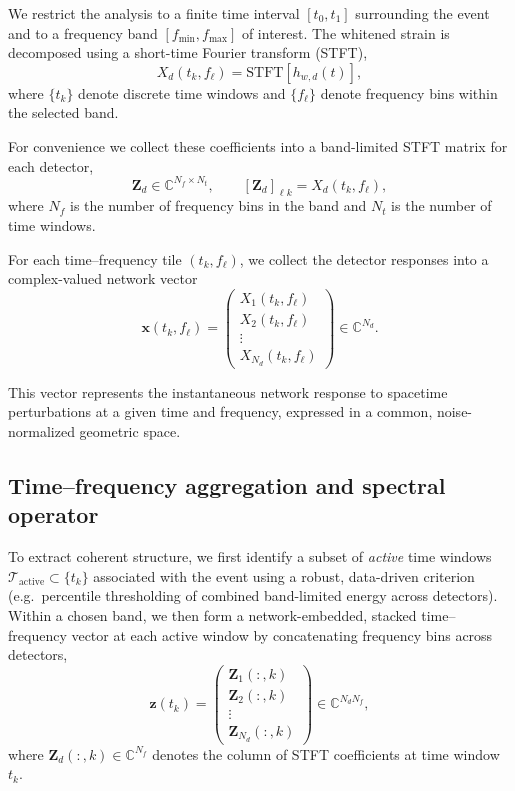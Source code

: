 \documentclass[11pt,a4paper]{article}
\begin{document}
We restrict the analysis to a finite time interval $[t_0, t_1]$ surrounding the event and to a frequency band $[f_{\min}, f_{\max}]$ of interest.
The whitened strain is decomposed using a short-time Fourier transform (STFT),
\begin{equation}
X_d(t_k, f_\ell) = \mathrm{STFT}\!\left[h_{w,d}(t)\right],
\end{equation}
where $\{t_k\}$ denote discrete time windows and $\{f_\ell\}$ denote frequency bins within the selected band.

For convenience we collect these coefficients into a band-limited STFT matrix for each detector,
\begin{equation}
\mathbf{Z}_d \in \mathbb{C}^{N_f \times N_t},
\qquad
[\mathbf{Z}_d]_{\ell k} = X_d(t_k,f_\ell),
\end{equation}
where $N_f$ is the number of frequency bins in the band and $N_t$ is the number of time windows.

For each time--frequency tile $(t_k, f_\ell)$, we collect the detector responses into a complex-valued network vector
\begin{equation}
\mathbf{x}(t_k, f_\ell) =
\begin{pmatrix}
X_1(t_k, f_\ell) \\
X_2(t_k, f_\ell) \\
\vdots \\
X_{N_d}(t_k, f_\ell)
\end{pmatrix}
\in \mathbb{C}^{N_d}.
\end{equation}

This vector represents the instantaneous network response to spacetime perturbations at a given time and frequency, expressed in a common, noise-normalized geometric space.

\subsection{Time--frequency aggregation and spectral operator}

To extract coherent structure, we first identify a subset of \emph{active} time windows
$\mathcal{T}_{\mathrm{active}} \subset \{t_k\}$ associated with the event using a robust, data-driven criterion
(e.g.\ percentile thresholding of combined band-limited energy across detectors).
Within a chosen band, we then form a network-embedded, stacked time--frequency vector at each active window by concatenating frequency bins across detectors,
\begin{equation}
\mathbf{z}(t_k)
=
\begin{pmatrix}
\mathbf{Z}_1(:,k) \\
\mathbf{Z}_2(:,k) \\
\vdots \\
\mathbf{Z}_{N_d}(:,k)
\end{pmatrix}
\in \mathbb{C}^{N_d N_f},
\end{equation}
where $\mathbf{Z}_d(:,k)\in\mathbb{C}^{N_f}$ denotes the column of STFT coefficients at time window $t_k$.
\end{document}
